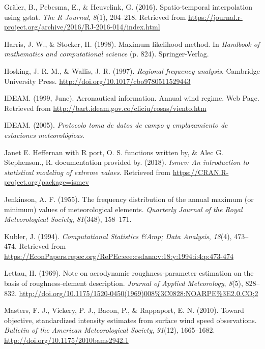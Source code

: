 \documentclass[12pt,oneside]{reedthesis}
\begin{document}
\leavevmode\hypertarget{ref-Graeler2016}{}%
Gräler, B., Pebesma, E., \& Heuvelink, G. (2016). Spatio-temporal interpolation using gstat. \emph{The R Journal}, \emph{8}(1), 204--218. Retrieved from \url{https://journal.r-project.org/archive/2016/RJ-2016-014/index.html}

\leavevmode\hypertarget{ref-Harris1994}{}%
Harris, J. W., \& Stocker, H. (1998). Maximum likelihood method. In \emph{Handbook of mathematics and computational science} (p. 824). Springer-Verlag.

\leavevmode\hypertarget{ref-Hosking1997}{}%
Hosking, J. R. M., \& Wallis, J. R. (1997). \emph{Regional frequency analysis}. Cambridge University Press. \url{http://doi.org/10.1017/cbo9780511529443}

\leavevmode\hypertarget{ref-ideam1999}{}%
IDEAM. (1999, June). Aeronautical information. Annual wind regime. Web Page. Retrieved from \url{http://bart.ideam.gov.co/cliciu/rosas/viento.htm}

\leavevmode\hypertarget{ref-ideam2005}{}%
IDEAM. (2005). \emph{Protocolo toma de datos de campo y emplazamiento de estaciones meteorológicas}.

\leavevmode\hypertarget{ref-JanetE.HeffernanwithRport2018}{}%
Janet E. Heffernan with R port, O. S. functions written by, \& Alec G. Stephenson., R. documentation provided by. (2018). \emph{Ismev: An introduction to statistical modeling of extreme values}. Retrieved from \url{https://CRAN.R-project.org/package=ismev}

\leavevmode\hypertarget{ref-Jenkinson1955}{}%
Jenkinson, A. F. (1955). The frequency distribution of the annual maximum (or minimum) values of meteorological elements. \emph{Quarterly Journal of the Royal Meteorological Society}, \emph{81}(348), 158--171.

\leavevmode\hypertarget{ref-Kubler1994}{}%
Kubler, J. (1994). \emph{Computational Statistics \&Amp; Data Analysis}, \emph{18}(4), 473--474. Retrieved from \url{https://EconPapers.repec.org/RePEc:eee:csdana:v:18:y:1994:i:4:p:473-474}

\leavevmode\hypertarget{ref-Lettau1969}{}%
Lettau, H. (1969). Note on aerodynamic roughness-parameter estimation on the basis of roughness-element description. \emph{Journal of Applied Meteorology}, \emph{8}(5), 828--832. \url{http://doi.org/10.1175/1520-0450(1969)008\%3C0828:NOARPE\%3E2.0.CO;2}

\leavevmode\hypertarget{ref-Masters2010}{}%
Masters, F. J., Vickery, P. J., Bacon, P., \& Rappaport, E. N. (2010). Toward objective, standardized intensity estimates from surface wind speed observations. \emph{Bulletin of the American Meteorological Society}, \emph{91}(12), 1665--1682. \url{http://doi.org/10.1175/2010bams2942.1}
\end{document}
